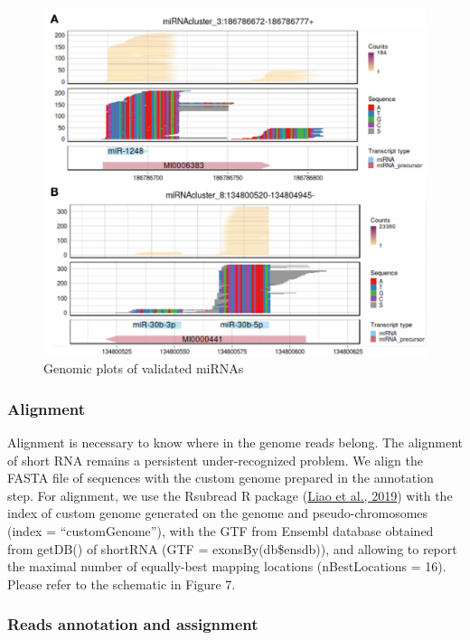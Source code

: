 \documentclass[12pt,twoside]{reedthesis}
\begin{document}
\begin{subfigures}
\begin{figure}[H]
{\centering \includegraphics{thesis_files/figure-latex/3f18b-1} 

}

\caption{Genomic plots of validated miRNAs}\label{fig:3f18b}
\end{figure}
\end{subfigures}
\hypertarget{alignment}{%
\subsubsection{Alignment}\label{alignment}}

Alignment is necessary to know where in the genome reads belong. The
alignment of short RNA remains a persistent under-recognized problem. We
align the FASTA file of sequences with the custom genome prepared in the
annotation step. For alignment, we use the Rsubread R package
(\protect\hyperlink{ref-liao2019}{Liao et al., 2019}) with the index of custom genome generated on the genome and
pseudo-chromosomes (index = ``customGenome''), with the GTF from Ensembl
database obtained from getDB() of shortRNA (GTF = exonsBy(db\$ensdb)),
and allowing to report the maximal number of equally-best mapping
locations (nBestLocations = 16). Please refer to the schematic in Figure
7.

\hypertarget{reads-annotation-and-assignment}{%
\subsubsection{Reads annotation and assignment}\label{reads-annotation-and-assignment}}
\end{document}
